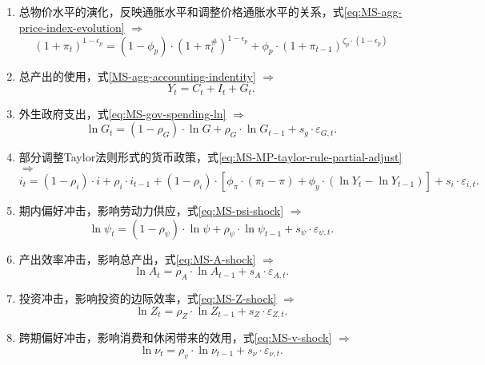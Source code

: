 \begin{enumerate}
\item 总物价水平的演化，反映通胀水平和调整价格通胀水平的关系，式\eqref{eq:MS-agg-price-index-evolution} $\Rightarrow$
\begin{equation*}
\left(1+\pi_t\right)^{1-\epsilon_p} = \left(1-\phi_p\right) \cdot \left(1+\pi_t^{\#}\right)^{1-\epsilon_p} + \phi_p \cdot \left(1+\pi_{t-1}\right)^{\zeta_p \cdot \left(1-\epsilon_p\right)}
\end{equation*}




\item 总产出的使用，式\eqref{MS-agg-accounting-indentity} $\Rightarrow$
\begin{equation*}
Y_t = C_t + I_t + G_t.
\end{equation*}

\item 外生政府支出，式\eqref{eq:MS-gov-spending-ln} $\Rightarrow$
\begin{equation*}
\ln G_t = (1-\rho_G) \cdot \ln G + \rho_G \cdot \ln G_{t-1} + s_g \cdot \varepsilon_{G,t}.
\end{equation*}

\item 部分调整Taylor法则形式的货币政策，式\eqref{eq:MS-MP-taylor-rule-partial-adjust} $\Rightarrow$
\begin{equation*}
i_t = \left( 1 - \rho_{i} \right) \cdot i + \rho_i \cdot i_{t-1} + \left( 1 - \rho_{i} \right) \cdot \left[
\phi_\pi \cdot \left(\pi_t - \pi \right)
+ \phi_y \cdot
\left(
\ln Y_t - \ln Y_{t-1}
\right)
\right]
+ s_i \cdot \varepsilon_{i,t}.
\end{equation*}

\item 期内偏好冲击，影响劳动力供应，式\eqref{eq:MS-psi-shock} $\Rightarrow$
\begin{equation*}
\ln \psi_t = \left(1-\rho_{\psi} \right) \cdot \ln \psi + \rho_{\psi} \cdot \ln \psi_{t-1} + s_{\psi} \cdot \varepsilon_{\psi, t}.
\end{equation*}

\item 产出效率冲击，影响总产出，式\eqref{eq:MS-A-shock} $\Rightarrow$
\begin{equation*}
\ln A_t = \rho_A \cdot \ln A_{t-1} + s_A \cdot \varepsilon_{A,t}.
\end{equation*}

\item 投资冲击，影响投资的边际效率，式\eqref{eq:MS-Z-shock} $\Rightarrow$
\begin{equation*}
\ln Z_t = \rho_Z \cdot \ln Z_{t-1} + s_Z \cdot \varepsilon_{Z,t}.
\end{equation*}

\item 跨期偏好冲击，影响消费和休闲带来的效用，式\eqref{eq:MS-v-shock} $\Rightarrow$
\begin{equation*}
\ln \nu_t = \rho_v \cdot \ln \nu_{t-1} + s_{\nu} \cdot \varepsilon_{\nu,t}.
\end{equation*}
\end{enumerate}

